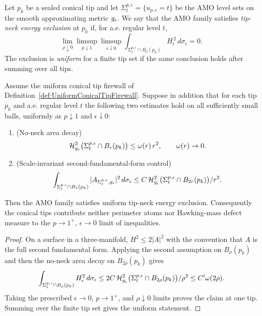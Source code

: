 \begin{definition}\label{def:TipNeckEnergyExclusion}
Let $p_k$ be a sealed conical tip and let
$\Sigma^{p,\epsilon}_t=\{u_{p,\epsilon}=t\}$ be the AMO level sets on the
smooth approximating metric $g_{\epsilon}$.  We say that the AMO family satisfies
\emph{tip-neck energy exclusion} at $p_k$ if, for a.e. regular level $t$,
\[
    \lim_{\rho\downarrow0}
    \limsup_{p\downarrow1}
    \limsup_{\epsilon\downarrow0}
    \int_{\Sigma^{p,\epsilon}_t\cap B_\rho(p_k)}
        H_{\epsilon}^{\,2}\,d\sigma_{\epsilon}
    =0 .
\]
The exclusion is \emph{uniform} for a finite tip set if the same conclusion
holds after summing over all tips.
\end{definition}

\begin{proposition}\label{prop:TipNeckEnergyCertificate}
Assume the uniform conical tip firewall of
Definition~\ref{def:UniformConicalTipFirewall}.  Suppose in addition that for
each tip $p_k$ and a.e. regular level $t$ the following two estimates hold on
all sufficiently small balls, uniformly as
$p\downarrow1$ and $\epsilon\downarrow0$:
\begin{enumerate}
    \item \textup{(No-neck area decay)}
    \[
        \mathcal H^2_{g_{\epsilon}}
        \bigl(\Sigma^{p,\epsilon}_t\cap B_r(p_k)\bigr)
        \le
        \omega(r)\, r^2 ,
        \qquad \omega(r)\to0 .
    \]
    \item \textup{(Scale-invariant second-fundamental-form control)}
    \[
        \int_{\Sigma^{p,\epsilon}_t\cap B_r(p_k)}
            |A_{\Sigma^{p,\epsilon}_t,g_{\epsilon}}|^2\,d\sigma_\epsilon
        \le
        C\,
        \mathcal H^2_{g_{\epsilon}}
        \bigl(\Sigma^{p,\epsilon}_t\cap B_{2r}(p_k)\bigr)/r^2 .
    \]
\end{enumerate}
Then the AMO family satisfies uniform tip-neck energy exclusion.  Consequently
the conical tips contribute neither perimeter atoms nor Hawking-mass defect
measure to the \(p\to1^+\), \(\epsilon\to0\) limit of inequalities.
\end{proposition}

\begin{proof}
On a surface in a three-manifold, $H^2\le 2|A|^2$ with the convention that
$A$ is the full second fundamental form.  Applying the second assumption on
$B_\rho(p_k)$ and then the no-neck area decay on $B_{2\rho}(p_k)$ gives
\[
    \int_{\Sigma^{p,\epsilon}_t\cap B_\rho(p_k)}
        H_\epsilon^2\,d\sigma_\epsilon
    \le 2C\,
    \mathcal H^2_{g_{\epsilon}}
    \bigl(\Sigma^{p,\epsilon}_t\cap B_{2\rho}(p_k)\bigr)/\rho^2
    \le C'\omega(2\rho).
\]
Taking the prescribed \(\epsilon\to0\), \(p\to1^+\), and \(\rho\downarrow0\)
limits proves the claim at one tip.  Summing over the finite tip set gives the
uniform statement.
\end{proof}

